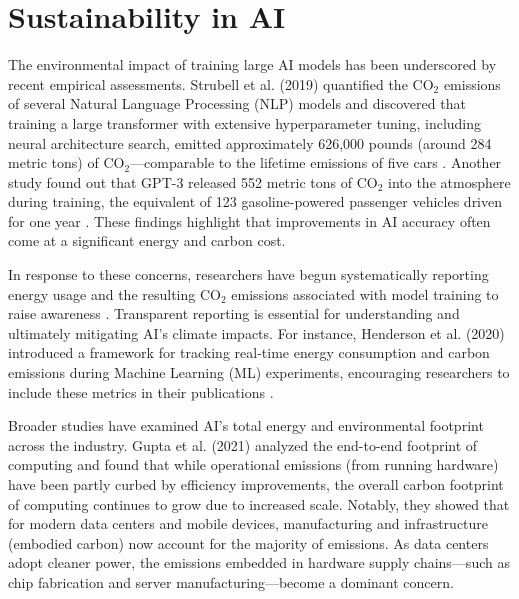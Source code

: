 \documentclass[a4paper,singleside,12pt]{report} %
\begin{document}
\section{Sustainability in AI}

The environmental impact of training large AI models has been underscored by recent empirical assessments. Strubell et al. (2019)
quantified the $\mathrm{CO_2}$ emissions of several Natural Language Processing (NLP) models and discovered that training a large
transformer with extensive hyperparameter tuning, including neural architecture search, emitted approximately 626,000 pounds 
(around 284 metric tons) of $\mathrm{CO_2}$—comparable to the lifetime emissions of five cars \cite{strubell2019energy}. 
Another study found out that GPT-3 released 552 metric tons of $\mathrm{CO_2}$ into the atmosphere during training, the 
equivalent of 123 gasoline-powered passenger vehicles driven for one year \cite{patterson2021carbon}. These findings highlight that 
improvements in AI accuracy often come at a significant energy and carbon cost.

In response to these concerns, researchers have begun systematically reporting energy usage and the resulting $\mathrm{CO_2}$ 
emissions associated with model training to raise awareness \cite{dodge2022carbon, patterson2021carbon}. Transparent reporting 
is essential for understanding and ultimately mitigating AI's climate impacts. For instance, Henderson et al. (2020) introduced 
a framework for tracking real-time energy consumption and carbon emissions during Machine Learning (ML) experiments, encouraging 
researchers to include these metrics in their publications \cite{henderson2020carbon}.

Broader studies have examined AI's total energy and environmental footprint across the industry. Gupta et al. (2021) analyzed 
the end-to-end footprint of computing and found that while operational emissions (from running hardware) have been partly curbed 
by efficiency improvements, the overall carbon footprint of computing continues to grow due to increased scale. Notably, they 
showed that for modern data centers and mobile devices, manufacturing and infrastructure (embodied carbon) now account for the 
majority of emissions. As data centers adopt cleaner power, the emissions embedded in hardware supply chains—such as chip 
fabrication and server manufacturing—become a dominant concern. \cite{gupta2020carbon}
\end{document}
